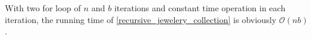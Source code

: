 \begin{homeworkProblem}
With two for loop of $n$ and $b$ iterations and constant time operation in each iteration, the running time of \cref{recursive_jewelery_collection} is obviously $\mathcal{O}(nb)$.



\end{homeworkProblem}
